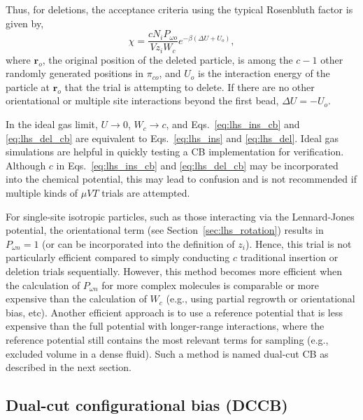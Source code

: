 \documentclass[
  9pt,
  bestpractices,
  pubversion,
]{livecoms}
\begin{document}
Thus, for deletions, the acceptance criteria using the typical Rosenbluth factor is given by,
\begin{equation}
\chi = \frac{c N_i P_{\omega o}}{Vz_i W_{c}}e^{-\beta(\Delta U + U_o)},
\label{eq:lhs_del_cb}
\end{equation}
where $\mathbf{r}_o$, the original position of the deleted particle, is among the ${c}-1$ other randomly generated positions in $\pi_{co}$, and $U_o$ is the interaction energy of the particle at $\mathbf{r}_o$ that the trial is attempting to delete.
If there are no other orientational or multiple site interactions beyond the first bead, $\Delta U = - U_o$.

In the ideal gas limit, $U\rightarrow 0$, $W_{c}\rightarrow{c}$, and Eqs.~\ref{eq:lhs_ins_cb} and \ref{eq:lhs_del_cb} are equivalent to Eqs.~\ref{eq:lhs_ins} and \ref{eq:lhs_del}.
Ideal gas simulations are helpful in quickly testing a CB implementation for verification.
Although ${c}$ in Eqs.~\ref{eq:lhs_ins_cb} and \ref{eq:lhs_del_cb} may be incorporated into the chemical potential, this may lead to confusion and is not recommended if multiple kinds of $\mu VT$ trials are attempted.

For single-site isotropic particles, such as those interacting via the Lennard-Jones potential, the orientational term (see Section~\ref{sec:lhs_rotation}) results in $P_{\omega n} = 1$ (or can be incorporated into the definition of $z_i$).
Hence, this trial is not particularly efficient compared to simply conducting $c$ traditional insertion or deletion trials sequentially.
However, this method becomes more efficient when the calculation of $P_{\omega n}$ for more complex molecules is comparable or more expensive than the calculation of $W_{c}$ (e.g., using partial regrowth or orientational bias, etc).
Another efficient approach is to use a reference potential that is less expensive than the full potential with longer-range interactions, where the reference potential still contains the most relevant terms for sampling (e.g., excluded volume in a dense fluid).
Such a method is named dual-cut CB \cite{vlugt_improving_1998} as described in the next section.

\subsection{\label{sec:lhs_insdel_dccb}Dual-cut configurational bias (DCCB)}
\end{document}
